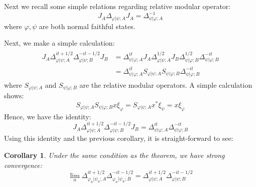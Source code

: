 \documentclass[a4paper,11pt]{article}
\newtheorem{corollary}[theorem]{Corollary}
\theoremstyle{definition}
\theoremstyle{remark}
\begin{document}
Next we recall some simple relations regarding relative modular operator:
\begin{equation}
    J_A\Delta_{\varphi|\psi;A}J_A = \Delta^{-1}_{\psi|\varphi;A}
\end{equation}
where $\varphi,\psi$ are both normal faithful states.

Next, we make a simple calculation:
\begin{align}
    \begin{split}
        J_A \Delta^{it + 1/2}_{\varphi|\psi;A}\Delta^{-it-1/2}_{\varphi|\psi;B} J_B &= \Delta^{it}_{\psi|\varphi;A} J_A\Delta^{1/2}_{\varphi|\psi;A}J_B\Delta^{1/2}_{\psi|\varphi;B}\Delta_{\psi|\varphi;B}^{-it}
        \\&=\Delta^{it}_{\psi|\varphi;A}S_{\varphi|\psi;A}S_{\psi|\varphi;B}\Delta^{-it}_{\psi|\varphi;B}
    \end{split}
\end{align}
where $S_{\varphi|\psi;A}$ and $S_{\psi|\varphi;B}$ are the relative modular operators. A simple calculation shows:
\begin{equation}
    S_{\varphi|\psi;A}S_{\psi|\varphi;B}x\xi_{\varphi} = S_{\varphi|\psi;A}x^*\xi_{\psi} = x\xi_{\varphi}
\end{equation}
Hence, we have the identity:
\begin{equation}
    J_A\Delta^{it+1/2}_{\varphi|\psi;A}\Delta^{-it-1/2}_{\varphi|\psi;B}J_B = \Delta^{it}_{\psi|\varphi;A}\Delta^{-it}_{\psi|\varphi;B}
\end{equation}
Using this identity and the previous corollary, it is straight-forward to see:
\begin{corollary}
    Under the same condition as the theorem, we have strong convergence:
    \begin{equation}
        \lim_n\Delta^{it + 1/2}_{\varphi_n|\psi_n;A}\Delta^{-it-1/2}_{\varphi_n|\psi_n;B} = \Delta^{it + 1/2}_{\varphi|\psi;A}\Delta^{-it-1/2}_{\varphi|\psi;B}
    \end{equation}
\end{corollary}
\end{document}
